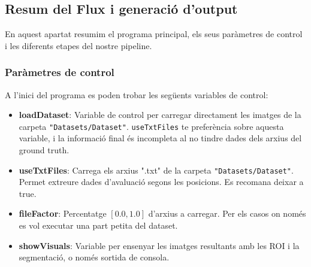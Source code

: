 
\subsection{Resum del Flux i generació d'output}
En aquest apartat resumim el programa principal, els seus paràmetres de control i les diferents etapes del nostre pipeline.

\subsubsection{Paràmetres de control}
A l'inici del programa es poden trobar les següents variables de control:
\begin{itemize}
    \item \textbf{loadDataset}: Variable de control per carregar directament les imatges de la carpeta \texttt{"Datasets/Dataset"}. \texttt{useTxtFiles} te preferència sobre aquesta variable, i la informació final és incompleta al no tindre dades dels arxius del ground truth.
    \item \textbf{useTxtFiles}: Carrega els arxius ".txt" de la carpeta \texttt{"Datasets/Dataset"}. Permet extreure dades d'avaluació segons les posicions. Es recomana deixar a true.
    \item \textbf{fileFactor}: Percentatge $[0.0, 1.0]$ d'arxius a carregar. Per els casos on només es vol executar una part petita del dataset.
    \item \textbf{showVisuals}: Variable per ensenyar les imatges resultants amb les ROI i la segmentació, o només sortida de consola.
\end{itemize}

